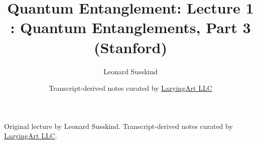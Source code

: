 \documentclass[11pt,oneside]{book}
\begin{document}
\frontmatter
\title{Quantum Entanglement: Lecture 1 : Quantum Entanglements, Part 3 (Stanford)}
\author{Leonard Susskind}
\date{Transcript-derived notes curated by \href{https://lazying.art}{LazyingArt LLC}}
\maketitle
\begin{center}
\small Original lecture by Leonard Susskind. Transcript-derived notes curated by \href{https://lazying.art}{LazyingArt LLC}.
\end{center}
\clearpage
\mainmatter

\end{document}

